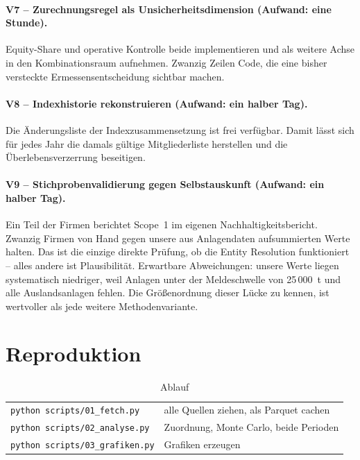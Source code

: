 \documentclass[11pt,a4paper]{article}
\begin{document}
\paragraph{V7 -- Zurechnungsregel als Unsicherheitsdimension (Aufwand: eine Stunde).}
Equity-Share und operative Kontrolle beide implementieren und als weitere Achse in den Kombinationsraum aufnehmen. Zwanzig Zeilen Code, die eine bisher versteckte Ermessensentscheidung sichtbar machen.

\paragraph{V8 -- Indexhistorie rekonstruieren (Aufwand: ein halber Tag).}
Die Änderungsliste der Indexzusammensetzung ist frei verfügbar. Damit lässt sich für jedes Jahr die damals gültige Mitgliederliste herstellen und die Überlebensverzerrung beseitigen.

\paragraph{V9 -- Stichprobenvalidierung gegen Selbstauskunft (Aufwand: ein halber Tag).}
Ein Teil der Firmen berichtet Scope~1 im eigenen Nachhaltigkeitsbericht. Zwanzig Firmen von Hand gegen unsere aus Anlagendaten aufsummierten Werte halten. Das ist die einzige direkte Prüfung, ob die Entity Resolution funktioniert -- alles andere ist Plausibilität. Erwartbare Abweichungen: unsere Werte liegen systematisch niedriger, weil Anlagen unter der Meldeschwelle von 25\,000~t und alle Auslandsanlagen fehlen. Die Größenordnung dieser Lücke zu kennen, ist wertvoller als jede weitere Methodenvariante.

\section{Reproduktion}

\begin{table}[htbp]
\centering\small
\caption{Ablauf}
\label{tab:repro}
\begin{tabular}{ll}
\toprule
\texttt{python scripts/01\_fetch.py} & alle Quellen ziehen, als Parquet cachen \\
\texttt{python scripts/02\_analyse.py} & Zuordnung, Monte Carlo, beide Perioden \\
\texttt{python scripts/03\_grafiken.py} & Grafiken erzeugen \\
\bottomrule
\end{tabular}
\end{table}
\end{document}

